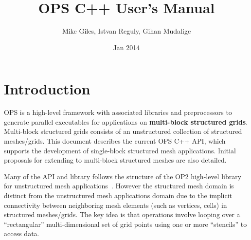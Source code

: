 \documentclass[11pt]{article}
\date{Jan 2014}
\begin{document}
\title{OPS C++ User's Manual}
\author{Mike Giles, Istvan Reguly, Gihan Mudalige}
\maketitle

\newpage


\tableofcontents


\newpage
\section{Introduction}


OPS is a high-level framework with associated libraries and preprocessors to generate parallel executables for
applications on \textbf{multi-block structured grids}. Multi-block structured grids consists of an unstructured
collection of structured meshes/grids. This document describes the current OPS C++ API, which supports the development
of single-block structured mesh applications. Initial proposals for extending to multi-block structured meshes are also
detailed. 

Many of the API and library follows the structure of the OP2 high-level library for unstructured mesh
applications~\cite{op2}. However the structured mesh domain is distinct from the unstructured mesh applications domain
due to the implicit connectivity between neighboring mesh elements (such as vertices, cells) in structured
meshes/grids. The key idea is that operations involve looping over a ``rectangular'' multi-dimensional set of grid
points using one or more ``stencils'' to access data.\\
\end{document}
